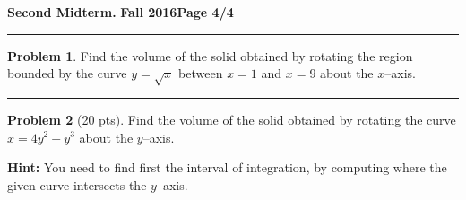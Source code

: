\documentclass[12pt]{article}
\theoremstyle{definition}
\newtheorem{problem}{Problem}
\begin{document}
\hfill{\large\bf Second Midterm.}\hfill{\large\bf
  Fall 2016}\hfill{\large\bf Page 4/4}\hrule

\bigskip
\begin{problem}
Find the volume of the solid obtained by rotating the region bounded by the curve $y=\sqrt{x}$ between $x=1$ and $x=9$ about the $x$--axis.
\vspace{8cm}
\begin{flushright}
\end{flushright}
\end{problem}
\hrule
\begin{problem}[20 pts]
Find the volume of the solid obtained by rotating the curve $x=4y^2-y^3$ about the $y$--axis.

\noindent\textbf{Hint:} You need to find first the interval of integration, by computing where the given curve intersects the $y$--axis.
\vspace{8.5cm}
\begin{flushright}
\end{flushright}
\end{problem}
\end{document}
